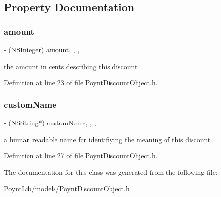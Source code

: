\subsection{Property Documentation}
\hypertarget{interface_poynt_discount_object_a6ff5079a7aa518c578773da69959732d}{}\label{interface_poynt_discount_object_a6ff5079a7aa518c578773da69959732d} 
\subsubsection{\texorpdfstring{amount}{amount}}
{\footnotesize\ttfamily -\/ (N\+S\+Integer) amount\hspace{0.3cm}{\ttfamily [read]}, {\ttfamily [write]}, {\ttfamily [nonatomic]}, {\ttfamily [assign]}}



the amount in cents describing this discount 



Definition at line 23 of file Poynt\+Discount\+Object.\+h.

\hypertarget{interface_poynt_discount_object_ae38352d9ec7d2d1f03df4d4646c1a641}{}\label{interface_poynt_discount_object_ae38352d9ec7d2d1f03df4d4646c1a641} 
\subsubsection{\texorpdfstring{custom\+Name}{customName}}
{\footnotesize\ttfamily -\/ (N\+S\+String$\ast$) custom\+Name\hspace{0.3cm}{\ttfamily [read]}, {\ttfamily [write]}, {\ttfamily [nonatomic]}, {\ttfamily [copy]}}



a human readable name for identifiying the meaning of this discount 



Definition at line 27 of file Poynt\+Discount\+Object.\+h.



The documentation for this class was generated from the following file\+:\begin{DoxyCompactItemize}
\item 
Poynt\+Lib/models/\hyperlink{_poynt_discount_object_8h}{Poynt\+Discount\+Object.\+h}\end{DoxyCompactItemize}
